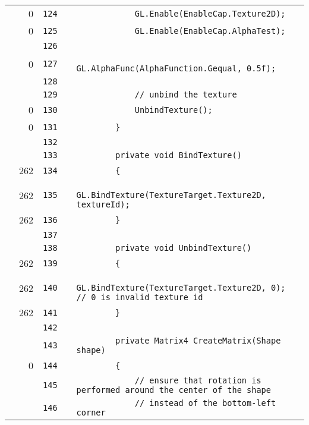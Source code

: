 \documentclass[a4paper,landscape,10pt]{article}
\begin{document}
\begin{longtable}[l]{lrrll}
\cellcolor{red} & 0 & \verb~124~ & & \verb~            GL.Enable(EnableCap.Texture2D);~\\
\cellcolor{red} & 0 & \verb~125~ & & \verb~            GL.Enable(EnableCap.AlphaTest);~\\
\cellcolor{gray} &  & \verb~126~ & & \verb~~\\
\cellcolor{red} & 0 & \verb~127~ & & \verb~            GL.AlphaFunc(AlphaFunction.Gequal, 0.5f);~\\
\cellcolor{gray} &  & \verb~128~ & & \verb~~\\
\cellcolor{gray} &  & \verb~129~ & & \verb~            // unbind the texture~\\
\cellcolor{red} & 0 & \verb~130~ & & \verb~            UnbindTexture();~\\
\cellcolor{red} & 0 & \verb~131~ & & \verb~        }~\\
\cellcolor{gray} &  & \verb~132~ & & \verb~~\\
\cellcolor{gray} &  & \verb~133~ & & \verb~        private void BindTexture()~\\
\cellcolor{green} & 262 & \verb~134~ & & \verb~        {~\\
\cellcolor{green} & 262 & \verb~135~ & & \verb~            GL.BindTexture(TextureTarget.Texture2D, textureId);~\\
\cellcolor{green} & 262 & \verb~136~ & & \verb~        }~\\
\cellcolor{gray} &  & \verb~137~ & & \verb~~\\
\cellcolor{gray} &  & \verb~138~ & & \verb~        private void UnbindTexture()~\\
\cellcolor{green} & 262 & \verb~139~ & & \verb~        {~\\
\cellcolor{green} & 262 & \verb~140~ & & \verb~            GL.BindTexture(TextureTarget.Texture2D, 0); // 0 is invalid texture id~\\
\cellcolor{green} & 262 & \verb~141~ & & \verb~        }~\\
\cellcolor{gray} &  & \verb~142~ & & \verb~~\\
\cellcolor{gray} &  & \verb~143~ & & \verb~        private Matrix4 CreateMatrix(Shape shape)~\\
\cellcolor{red} & 0 & \verb~144~ & & \verb~        {~\\
\cellcolor{gray} &  & \verb~145~ & & \verb~            // ensure that rotation is performed around the center of the shape~\\
\cellcolor{gray} &  & \verb~146~ & & \verb~            // instead of the bottom-left corner~\\

\end{longtable}
\end{document}
